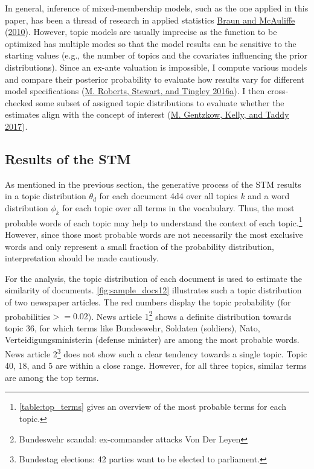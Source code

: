 \documentclass[
]{article}
\begin{document}
In general, inference of mixed-membership models, such as the one
applied in this paper, has been a thread of research in applied
statistics \protect\hyperlink{ref-braun_variational_2010}{Braun and
McAuliffe} (\protect\hyperlink{ref-braun_variational_2010}{2010}).
However, topic models are usually imprecise as the function to be
optimized has multiple modes so that the model results can be sensitive
to the starting values (e.g., the number of topics and the covariates
influencing the prior distributions). Since an ex-ante valuation is
impossible, I compute various models and compare their posterior
probability to evaluate how results vary for different model
specifications (\protect\hyperlink{ref-roberts_navigating_2016}{M.
Roberts, Stewart, and Tingley 2016a}). I then cross-checked some subset
of assigned topic distributions to evaluate whether the estimates align
with the concept of interest
(\protect\hyperlink{ref-gentzkow_text_2017}{M. Gentzkow, Kelly, and
Taddy 2017}).

\hypertarget{results-of-the-stm}{%
\subsection{Results of the STM}\label{results-of-the-stm}}

As mentioned in the previous section, the generative process of the STM
results in a topic distribution \(\theta_d\) for each document 4d4 over
all topics \(k\) and a word distribution \(\phi_k\) for each topic over
all terms in the vocabulary. Thus, the most probable words of each topic
may help to understand the context of each topic.\footnote{\autoref{table:top_terms}
  gives an overview of the most probable terms for each topic.} However,
since those most probable words are not necessarily the most exclusive
words and only represent a small fraction of the probability
distribution, interpretation should be made cautiously.

For the analysis, the topic distribution of each document is used to
estimate the similarity of documents. \autoref{fig:sample_docs12}
illustrates such a topic distribution of two newspaper articles. The red
numbers display the topic probability (for probabilities\(>= 0.02\)).
News article 1\footnote{Bundeswehr scandal: ex-commander attacks Von Der
  Leyen} shows a definite distribution towards topic 36, for which terms
like Bundeswehr, Soldaten (soldiers), Nato, Verteidigungsministerin
(defense minister) are among the most probable words. News article
2\footnote{Bundestag elections: 42 parties want to be elected to
  parliament.} does not show such a clear tendency towards a single
topic. Topic 40, 18, and 5 are within a close range. However, for all
three topics, similar terms are among the top terms.
\end{document}
